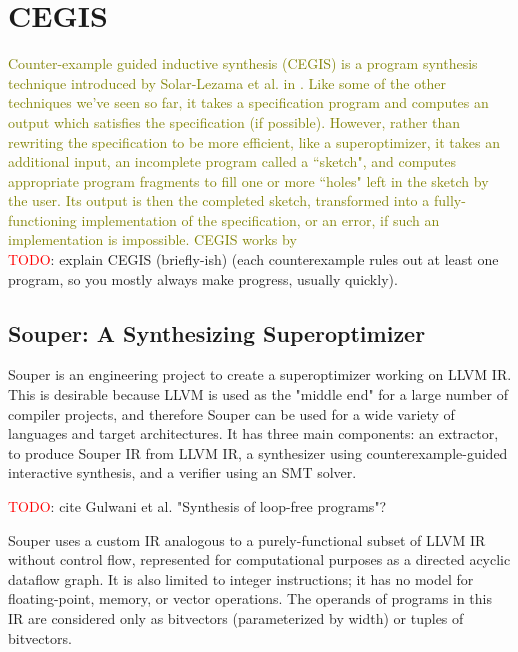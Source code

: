 \documentclass[12pt,twoside]{reedthesis}
\newcommand{\red}[1]{\textcolor{red}{#1}}
\newcommand{\green}[1]{\textcolor{olive}{#1}}
\begin{document}
    \section{CEGIS}
        \green{
        Counter-example guided inductive synthesis (CEGIS) is a program synthesis technique introduced by Solar-Lezama et al. in \cite{solar-lezama2006sketch}.
        Like some of the other techniques we've seen so far, it takes a specification program and computes an output which satisfies the specification (if possible).
        However, rather than rewriting the specification to be more efficient, like a superoptimizer, it takes an additional input, an incomplete program called a ``sketch", and computes appropriate program fragments to fill one or more ``holes" left in the sketch by the user.
        Its output is then the completed sketch, transformed into a fully-functioning implementation of the specification, or an error, if such an implementation is impossible.
        CEGIS works by 
        }
        \\  \red{TODO}: explain CEGIS (briefly-ish) (each counterexample rules out at least one program, so you mostly always make progress, usually quickly).

        \subsection{Souper: A Synthesizing Superoptimizer}
            Souper \cite{sasnauskas2017souper} is an engineering project to create a superoptimizer working on LLVM IR.
            This is desirable because LLVM is used as the "middle end" for a large number of compiler projects, and therefore Souper can be used for a wide variety of languages and target architectures.
            It has three main components:
                an extractor, to produce Souper IR from LLVM IR,
                a synthesizer using counterexample-guided interactive synthesis,
                and a verifier using an SMT solver.
            
            \red{TODO}: cite Gulwani et al. "Synthesis of loop-free programs"?
            
            Souper uses a custom IR analogous to a purely-functional subset of LLVM IR without control flow\footnotemark, represented for computational purposes as a directed acyclic dataflow graph.
            It is also limited to integer instructions; it has no model for floating-point, memory, or vector operations.
            The operands of programs in this IR are considered only as bitvectors (parameterized by width) or tuples of bitvectors.
            
\end{document}
